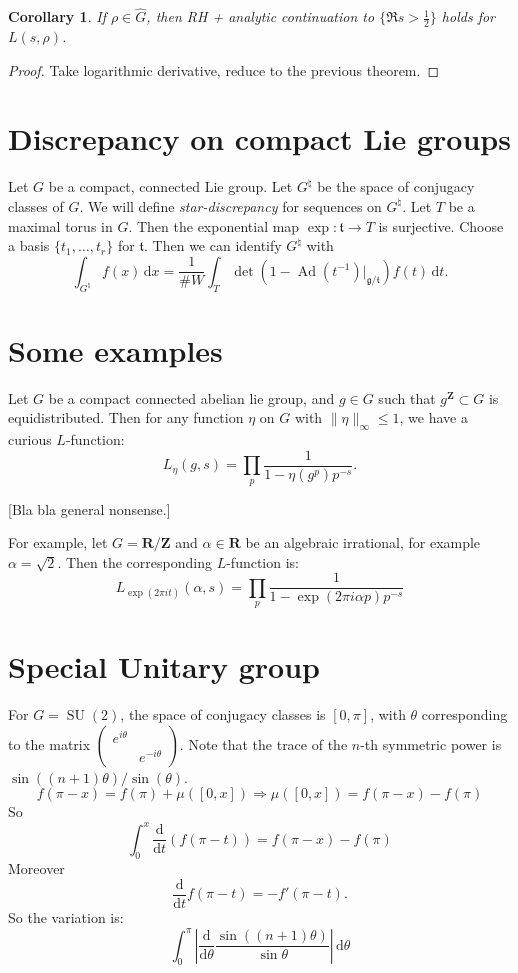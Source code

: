 \documentclass{article}
\DeclareMathOperator{\Ad}{Ad}
\DeclareMathOperator{\SU}{SU}
\newcommand{\bR}{\mathbf{R}}
\newcommand{\bZ}{\mathbf{Z}}
\newcommand{\dd}{\mathrm{d}}
\newcommand{\fg}{\mathfrak{g}}
\newcommand{\ft}{\mathfrak{t}}
\newtheorem{corollary}[subsection]{Corollary}
\theoremstyle{definition}
\begin{document}
\begin{corollary}
If $\rho\in \widehat G$, then RH + analytic continuation to 
$\{\Re s>\frac 1 2\}$ holds for $L(s,\rho)$. 
\end{corollary}
\begin{proof}
Take logarithmic derivative, reduce to the previous theorem. 
\end{proof}





\section{Discrepancy on compact Lie groups}

Let $G$ be a compact, connected Lie group. Let $G^\natural$ be the space of 
conjugacy classes of $G$. We will define \emph{star-discrepancy} for sequences 
on $G^\natural$. Let $T$ be a maximal torus in $G$. Then the exponential map 
$\exp\colon \ft\to T$ is surjective. Choose a basis $\{t_1,\dots,t_r\}$ for 
$\ft$. Then we can identify $G^\natural$ with 
\[
	\int_{G^\natural} f(x)\, \dd x = \frac{1}{\# W}\int_T \det(1-\Ad(t^{-1})|_{\fg/\ft}) f(t)\, \dd t .
\]

\section{Some examples}

Let $G$ be a compact connected abelian lie group, and $g\in G$ such that 
$g^\bZ\subset G$ is equidistributed. Then for any function $\eta$ on $G$ with 
$\|\eta\|_\infty\leqslant 1$, we have a curious $L$-function:
\[
	L_\eta(g,s) = \prod_p \frac{1}{1-\eta(g^p) p^{-s}} .
\]

[Bla bla general nonsense.]

For example, let $G=\bR/\bZ$ and $\alpha\in \bR$ be an algebraic irrational, 
for example $\alpha=\sqrt 2$. Then the corresponding $L$-function is:
\[
	L_{\exp(2\pi it)}(\alpha,s) = \prod_p \frac{1}{1-\exp(2\pi i \alpha p) p^{-s}}
\]





\section{Special Unitary group}

For $G=\SU(2)$, the space of conjugacy classes is $[0,\pi]$, with $\theta$ 
corresponding to the matrix $\begin{pmatrix} e^{i\theta} \\ & e^{-i\theta} \end{pmatrix}$. Note that the trace of the $n$-th symmetric power is 
$\sin((n+1)\theta)/\sin(\theta)$. 
\[
	f(\pi-x) = f(\pi) + \mu([0,x]) \Rightarrow \mu([0,x]) = f(\pi-x)-f(\pi)
\]
So
\[
	\int_0^x \frac{\dd}{\dd t}(f(\pi-t)) = f(\pi-x)-f(\pi)
\]
Moreover
\[
	\frac{\dd}{\dd t} f(\pi-t) = -f'(\pi-t) .
\]
So the variation is:
\[
	\int_0^\pi \left|\frac{\dd}{\dd \theta} \frac{\sin((n+1)\theta)}{\sin\theta}\right|\, \dd \theta 
\]
\end{document}
